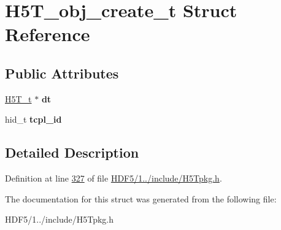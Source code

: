 \hypertarget{struct_h5_t__obj__create__t}{}\section{H5\+T\+\_\+obj\+\_\+create\+\_\+t Struct Reference}
\label{struct_h5_t__obj__create__t}
\subsection*{Public Attributes}
\begin{DoxyCompactItemize}
\item 
\mbox{\label{struct_h5_t__obj__create__t_a3c0ca9e4c2b0fd2acaffb06169609e70}} 
\hyperlink{struct_h5_t__t}{H5\+T\+\_\+t} $\ast$ {\bfseries dt}
\item 
\mbox{\label{struct_h5_t__obj__create__t_a4ae6504bac9d9b58a2a74e0d7e51c95c}} 
hid\+\_\+t {\bfseries tcpl\+\_\+id}
\end{DoxyCompactItemize}


\subsection{Detailed Description}


Definition at line \hyperlink{_h_d_f5_21_810_81_2include_2_h5_tpkg_8h_source_l00327}{327} of file \hyperlink{_h_d_f5_21_810_81_2include_2_h5_tpkg_8h_source}{H\+D\+F5/1../include/\+H5\+Tpkg.\+h}.



The documentation for this struct was generated from the following file\+:\begin{DoxyCompactItemize}
\item 
H\+D\+F5/1../include/\+H5\+Tpkg.\+h\end{DoxyCompactItemize}
